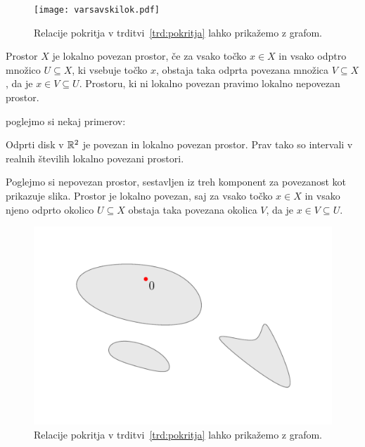 \documentclass[../TG_magistrsko_delo_sections.tex]{subfiles}
\begin{document}
\begin{figure}[h]
  \centering
  \texttt{[image: varsavskilok.pdf]}
  \caption[Primer vektorske slike.]{Relacije pokritja v trditvi~\ref{trd:pokritja} lahko prikažemo z grafom.}
  \label{fig:varsavski_lok}
\end{figure}

\begin{definicija}
Prostor $X$ je lokalno povezan prostor, če za vsako točko $x \in X$ in vsako odptro množico $U \subseteq X$, ki vsebuje točko $x$, obstaja taka odprta povezana množica $V \subseteq X$, da je $x \in V \subseteq U$. Prostoru, ki ni lokalno povezan pravimo lokalno nepovezan prostor.
\end{definicija}

poglejmo si nekaj primerov:
\begin{primer}
Odprti disk v $\mathbb R^2$ je povezan in lokalno povezan prostor. Prav tako so intervali v realnih številih lokalno povezani prostori.
\end{primer}

\begin{primer}
Poglejmo si nepovezan prostor, sestavljen iz treh komponent za povezanost kot prikazuje slika. Prostor je lokalno povezan, saj za vsako točko $x \in X$ in vsako njeno odprto okolico $U\subseteq X$ obstaja taka povezana okolica $V$, da je $x \in V \subseteq U$.
\begin{figure}[h]
  \centering
  \includegraphics{nepov-lokpov.pdf}
  \caption[Primer vektorske slike.]{Relacije pokritja v trditvi~\ref{trd:pokritja} lahko prikažemo z grafom.}
  \label{fig:varsavski_lok}
\end{figure}
\end{primer}
\end{document}
